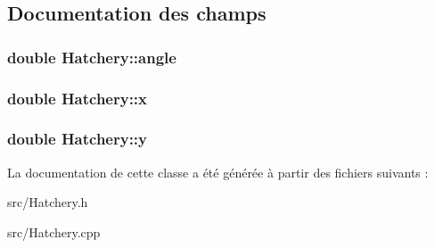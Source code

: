 \subsection{Documentation des champs}
\hypertarget{classHatchery_a4e56c9314b9a9dfe1718d43e30f3d4d0}{
\subsubsection[{angle}]{\setlength{\rightskip}{0pt plus 5cm}double {\bf Hatchery::angle}}}
\label{classHatchery_a4e56c9314b9a9dfe1718d43e30f3d4d0}
\hypertarget{classHatchery_ae56bf748a2046b42e2b174c17e4caeda}{
\subsubsection[{x}]{\setlength{\rightskip}{0pt plus 5cm}double {\bf Hatchery::x}}}
\label{classHatchery_ae56bf748a2046b42e2b174c17e4caeda}
\hypertarget{classHatchery_a99f0ef4a290d0bc1e65976b5979b29b7}{
\subsubsection[{y}]{\setlength{\rightskip}{0pt plus 5cm}double {\bf Hatchery::y}}}
\label{classHatchery_a99f0ef4a290d0bc1e65976b5979b29b7}


La documentation de cette classe a été générée à partir des fichiers suivants :\begin{DoxyCompactItemize}
\item 
src/Hatchery.h\item 
src/Hatchery.cpp\end{DoxyCompactItemize}
